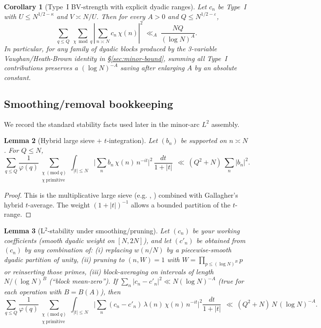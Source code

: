 \documentclass[11pt]{article}
\newtheorem{lemma}{Lemma}[part]
\newtheorem{corollary}[lemma]{Corollary}
\theoremstyle{definition}
\theoremstyle{remark}
\numberwithin{equation}{part}
\begin{document}
\begin{corollary}[Type~I BV-strength with explicit dyadic ranges]
	\label{cor:typeI-BV}
	Let $c_n$ be Type~I with $U\le N^{1/2-\kappa}$ and $V\asymp N/U$. Then for every $A>0$ and $Q\le N^{1/2-\varepsilon}$,
	\[
		\sum_{q\le Q}\ \sum_{\chi \bmod q}\left|\sum_{n\asymp N} c_n\,\chi(n)\right|^2
		\ \ll_A\ \frac{NQ}{(\log N)^A}.
	\]
	In particular, for any family of dyadic blocks produced by the 3-variable Vaughan/Heath-Brown identity in \S\ref{sec:minor-bound}, summing \emph{all} Type~I contributions preserves a $(\log N)^{-A}$ saving after enlarging $A$ by an absolute constant.
\end{corollary}


\subsection*{Smoothing/removal bookkeeping}\label{subsec:smoothing-book}
We record the standard stability facts used later in the minor-arc $L^2$ assembly.

\begin{lemma}[Hybrid large sieve $+$ $t$-integration]\label{lem:hybrid-ls}
	Let $(b_n)$ be supported on $n\asymp N$. For $Q\le N$,
	\[
		\sum_{q\le Q} \frac{1}{\varphi(q)}
		\sum_{\substack{\chi\ (\mathrm{mod}\ q)\\ \chi\ \mathrm{primitive}}}
		\int_{|t|\le N}
		\Big|\sum_{n} b_n\,\chi(n)\,n^{-it}\Big|^2\,\frac{dt}{1+|t|}
		\ \ \ll\ (Q^2+N)\ \sum_{n}|b_n|^2.
	\]
\end{lemma}

\begin{proof}
	This is the multiplicative large sieve (e.g. \cite[Ch.~7]{MV}, \cite[Thm.~3.13]{IK}) combined with Gallagher's hybrid \(t\)-average. The weight \((1+|t|)^{-1}\) allows a bounded partition of the \(t\)-range.
\end{proof}


\begin{lemma}[L$^2$-stability under smoothing/pruning]\label{lem:l2-smooth}
	Let $(c_n)$ be your working coefficients (smooth dyadic weight on $[N,2N]$), and let $(c'_n)$ be obtained from $(c_n)$ by any combination of:
	(i) replacing $w(n/N)$ by a piecewise-smooth dyadic partition of unity,
	(ii) pruning to $(n,W)=1$ with $W=\prod_{p\le (\log N)^B}p$ or reinserting those primes,
	(iii) block-averaging on intervals of length $N/(\log N)^B$ (“block mean-zero”).
	If $\sum_n |c_n-c'_n|^2 \ll N(\log N)^{-A}$ (true for each operation with $B=B(A)$), then
	\[
		\sum_{q\le Q} \frac{1}{\varphi(q)}\!\!
		\sum_{\substack{\chi\ (\mathrm{mod}\ q)\\ \chi\ \mathrm{primitive}}}
		\!\int_{|t|\le N}\!
		\Big|\sum_{n} (c_n-c'_n)\,\lambda(n)\,\chi(n)\,n^{-it}\Big|^2\frac{dt}{1+|t|}
		\ \ \ll\ (Q^2+N)\,N\,(\log N)^{-A}.
	\]
\end{lemma}
\end{document}
